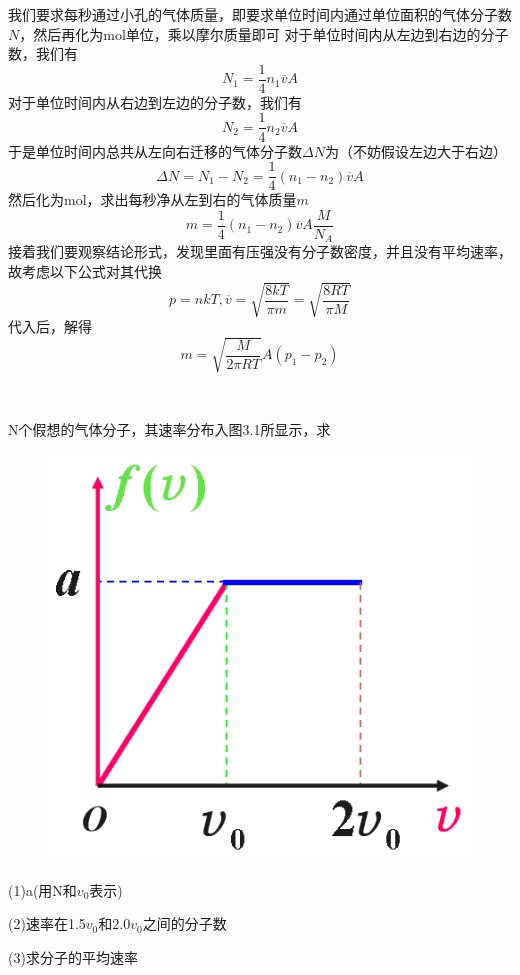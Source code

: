\documentclass[lang=cn,10pt]{elegantbook}
\begin{document}
	\begin{solution}
		我们要求每秒通过小孔的气体质量，即要求单位时间内通过单位面积的气体分子数$N$，然后再化为mol单位，乘以摩尔质量即可
		对于单位时间内从左边到右边的分子数，我们有
		\begin{equation*}
			N_{1}=\frac{1}{4}n_{1}\overline{v}A
		\end{equation*}
		对于单位时间内从右边到左边的分子数，我们有
		\begin{equation*}
			N_{2}=\frac{1}{4}n_{2}\overline{v}A
		\end{equation*}
		于是单位时间内总共从左向右迁移的气体分子数$\varDelta N$为（不妨假设左边大于右边）
		\begin{equation*}
			\varDelta N=N_{1}-N_{2}=\frac{1}{4}(n_{1}-n_{2})\overline{v}A
		\end{equation*}
		然后化为mol，求出每秒净从左到右的气体质量$m$
		\begin{equation*}
			m=\frac{1}{4}(n_{1}-n_{2})\overline{v}A\frac{M}{N_{A}}
		\end{equation*}
		接着我们要观察结论形式，发现里面有压强没有分子数密度，并且没有平均速率，故考虑以下公式对其代换
		\begin{equation*}
			p=nkT,	\overline{v}=\sqrt{\frac{8kT}{\pi m}}=\sqrt{\dfrac{8RT}{\pi M}}
		\end{equation*}
		代入后，解得
		\begin{equation*}
			m=\sqrt{\frac{M}{2\pi RT}}A\left( p_1-p_2 \right)
		\end{equation*}
		
	\end{solution}
	~\\
	\begin{example}
		N个假想的气体分子，其速率分布入图3.1所显示，求
		\begin{figure}[H]
			\centering
			\includegraphics[width=0.2\linewidth]{screenshot003}
			\caption{}
			\label{fig:screenshot003}
		\end{figure}
		
		(1)a(用N和$v_{0}$表示)
		
		(2)速率在1.5$v_{0}$和$2.0v_{0}$之间的分子数
		
		(3)求分子的平均速率
	\end{example}
\end{document}
